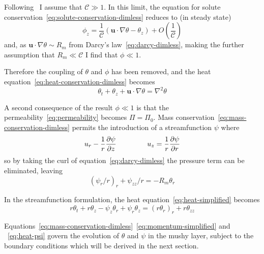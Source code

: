 \documentclass[11pt]{proc}
\newcommand{\CompRatio}{\mathscr{C}}
\begin{document}
Following~\citet*{rees-jones-worster-13} I assume that $\CompRatio \gg 1$. In this limit, the equation for solute conservation~\eqref{eq:solute-conservation-dimless} reduces to (in steady state)
\begin{equation}
\phi_z = \frac{1}{\CompRatio} \left( \mathbf{u} \cdot \nabla \theta - \theta_z \right) + O\left(\frac{1}{\CompRatio}\right)
\end{equation}
and, as $\mathbf{u} \cdot \nabla \theta \sim R_m$ from Darcy's law~\eqref{eq:darcy-dimless}, making the further assumption that $R_m \ll \CompRatio$ I find that $\phi \ll 1$. 

Therefore the coupling of $\theta$ and $\phi$ has been removed, and the heat equation~\eqref{eq:heat-conservation-dimless} becomes
\begin{equation}
\label{eq:heat-simplified}
\theta_t + \theta_z + \mathbf{u} \cdot \nabla \theta  = \nabla^2 \theta
\end{equation}

A second consequence of the result $\phi \ll 1$ is that the permeability~\eqref{eq:permeability} becomes $\Pi=\Pi_0$. Mass conservation~\eqref{eq:mass-conservation-dimless} permits the introduction of a streamfunction $\psi$ where 
\begin{equation}
u_r  - \frac{1}{r} \frac{\partial \psi}{\partial z} \hspace{10ex} u_z= \frac{1}{r} \frac{\partial \psi}{\partial r}
\end{equation}
so by taking the curl of equation~\eqref{eq:darcy-dimless} the pressure term can be eliminated, leaving
\begin{equation}
\label{eq:momentum-simplified}
(\psi_r/r)_r + \psi_{zz}/r = -R_m \theta_r
\end{equation}

In the streamfunction formulation, the heat equation~\eqref{eq:heat-simplified} becomes
\begin{equation}
\label{eq:heat-psi}
r \theta_t + r \theta_z - \psi_z \theta_r + \psi_r \theta_z = (r \theta_r)_r + r \theta_{zz}
\end{equation}

Equations~\eqref{eq:mass-conservation-dimless}~\eqref{eq:momentum-simplified} and ~\eqref{eq:heat-psi} govern the evolution of $\theta$ and $\psi$ in the mushy layer, subject to the boundary conditions which will be derived in the next section.
\end{document}
